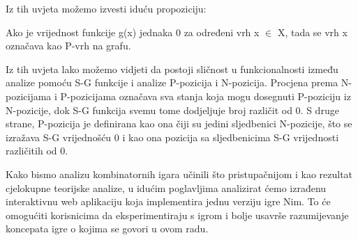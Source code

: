 Iz tih uvjeta možemo izvesti iduću propoziciju:

\begin{proposition}
Ako je vrijednost funkcije g(x) jednaka 0 za određeni vrh x $\in$ X, tada se vrh x označava kao P-vrh na grafu.
\end{proposition}

Iz tih uvjeta lako možemo vidjeti da postoji sličnost u funkcionalnosti između analize pomoću S-G funkcije i analize P-pozicija i N-pozicija. Procjena prema N-pozicijama i P-pozicijama označava sva stanja koja mogu dosegnuti P-poziciju iz N-pozicije, dok S-G funkcija svemu tome dodjeljuje broj različit od 0. S druge strane, P-pozicija je definirana kao ona čiji su jedini sljedbenici N-pozicije, što se izražava S-G vrijednošću 0 i kao ona pozicija sa sljedbenicima S-G vrijednosti različitih od 0.




Kako bismo analizu kombinatornih igara učinili što pristupačnijom i kao rezultat cjelokupne teorijske analize, u idućim poglavljima analizirat ćemo izrađenu interaktivnu web aplikaciju koja implementira jednu verziju igre Nim. To će omogućiti korisnicima da eksperimentiraju s igrom i bolje usavrše razumijevanje koncepata igre o kojima se govori u ovom radu.